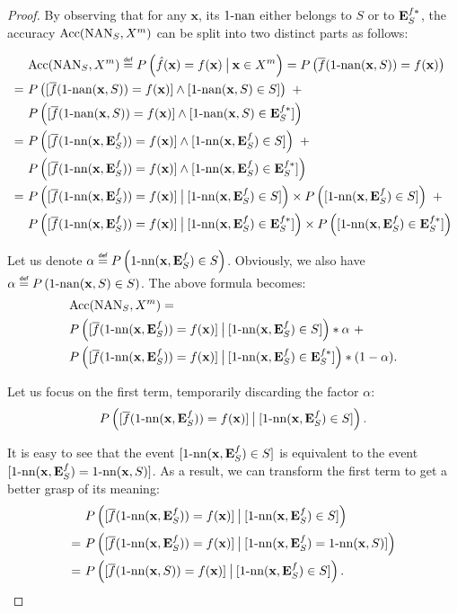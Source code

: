 \begin{proof}
By observing that for any $\mathbf{x}$, its $\nan$ either belongs to $S$ or to
$\esfs$, the accuracy $\acc(\NAN_S, X^m)$ can be split into two distinct parts as follows:

\begin{align*}
  &\acc(\NAN_S, X^m) \eqdef P\left(\hat{f}(\mathbf{x})=f(\mathbf{x}) \given[\big] \mathbf{x} \in
  X^m\right) = P\left(\albl{\nan(\mathbf{x}, S)} = f(\mathbf{x})\right)\\
  =~&P\left([\albl{\nan(\mathbf{x}, S)} = f(\mathbf{x}) ]\wedge
  [\nan(\mathbf{x}, S) \in S ] \right)~ +\\
  &P\left([\albl{\nan(\mathbf{x}, S)} = f(\mathbf{x})] \wedge [\nan(\mathbf{x},
  S) \in \esfs]\right)\\
  =~&P\left([\albl{\nn(\mathbf{x}, \esf)} = f(\mathbf{x})] \wedge
  [\nn(\mathbf{x}, \esf) \in S ]\right)~ +\\
  &P\left([\albl{\nn(\mathbf{x}, \esf)} = f(\mathbf{x})] \wedge
  [\nn(\mathbf{x}, \esf) \in \esfs]\right) \\
  =~&P\left([\albl{\nn(\mathbf{x}, \esf)} = f(\mathbf{x})] \given[\big]
  [\nn(\mathbf{x}, \esf) \in S ]\right) \times
  P\left([\nn(\mathbf{x}, \esf) \in S]\right) ~+ \\
  &P\left([\albl{\nn(\mathbf{x}, \esf)} = f(\mathbf{x})] \given[\big]
  [\nn(\mathbf{x}, \esf) \in \esfs]\right) \times
  P\left([ \nn(\mathbf{x}, \esf) \in \esfs]\right)
\end{align*}

Let us denote  $\alpha \eqdef P\left(\nn(\mathbf{x}, \esf) \in S\right)$.
Obviously, we also have $\alpha \eqdef P\left(\nan(\mathbf{x}, S) \in
S\right)$.  The above formula becomes:
\begin{align*}
  &\acc(\NAN_S, X^m) = \\&P\left([\albl{\nn(\mathbf{x}, \esf)} = f(\mathbf{x})]
  \given[\big] [\nn(\mathbf{x}, \esf) \in S] \right) * \alpha ~+ \\
  &P\left([\albl{\nn(\mathbf{x}, \esf)} = f(\mathbf{x})] \given[\big]
  [\nn(\mathbf{x}, \esf) \in \esfs]\right) * (1 - \alpha).
\end{align*}

Let us focus on the first term, temporarily discarding the factor $\alpha$:
$$P\left([\albl{\nn(\mathbf{x}, \esf)} = f(\mathbf{x})] \given[\big]
[\nn(\mathbf{x}, \esf) \in S] \right).$$

It is easy to see that the event $[\nn(\mathbf{x}, \esf) \in S]$ is equivalent
to the event $[\nn(\mathbf{x}, \esf) = \nn(\mathbf{x}, S)]$. As a result, we
can transform the first term to get a better grasp of its meaning:
\begin{align*}
  &P\left([\albl{\nn(\mathbf{x}, \esf)} = f(\mathbf{x})] \given[\big]
  [\nn(\mathbf{x}, \esf) \in S] \right)\\
  =~ &P\left([\albl{\nn(\mathbf{x},\esf)} = f(\mathbf{x})] \given[\big]
  [\nn(\mathbf{x}, \esf) = \nn(\mathbf{x}, S)]\right)\\
  =~ &P\left([\albl{\nn(\mathbf{x}, S)} = f(\mathbf{x})] \given[\big]
  [\nn(\mathbf{x}, \esf) \in S]\right).
\end{align*}


\end{proof}
